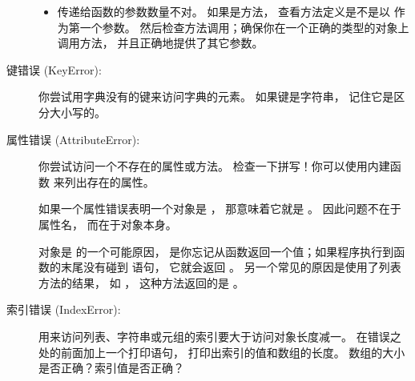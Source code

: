 \begin{description}
\begin{itemize}
\item 传递给函数的参数数量不对。  如果是方法， 查看方法定义是不是以  作为第一个参数。  然后检查方法调用；确保你在一个正确的类型的对象上调用方法， 并且正确地提供了其它参数。

\end{itemize}


\item[键错误 (KeyError):]  你尝试用字典没有的键来访问字典的元素。  如果键是字符串， 记住它是区分大小写的。


\item[属性错误 (AttributeError):]  你尝试访问一个不存在的属性或方法。  检查一下拼写！你可以使用内建函数  来列出存在的属性。



如果一个属性错误表明一个对象是  ， 那意味着它就是  。  因此问题不在于属性名， 而在于对象本身。


对象是  的一个可能原因， 是你忘记从函数返回一个值；如果程序执行到函数的末尾没有碰到  语句， 它就会返回  。  另一个常见的原因是使用了列表方法的结果， 如  ， 这种方法返回的是  。


\item[索引错误 (IndexError):]  用来访问列表、字符串或元组的索引要大于访问对象长度减一。  在错误之处的前面加上一个打印语句， 打印出索引的值和数组的长度。  数组的大小是否正确？索引值是否正确？

\end{description}

